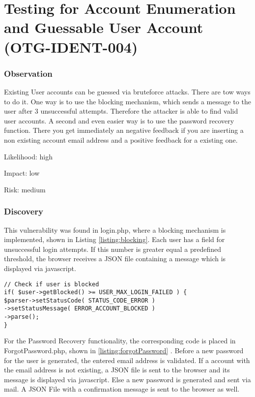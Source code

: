 \chapter{Testing for Account Enumeration and Guessable User Account (OTG-IDENT-004)}
\subsection{Observation}
Existing User accounts can be guessed via bruteforce attacks. There are tow ways to do it. One way is to use the blocking mechanism, which sends a message to the user after 3 unsuccessful attempts. Therefore the attacker is able to find valid user accounts.
A second and even easier way is to use the  password recovery function. There you get immediately an negative feedback if you are inserting a non existing account email address and a positive feedback for a existing  one.


Likelihood: high \newline

Impact: low\newline

Risk: medium\newline

\subsection{Discovery}
This vulnerability was found in login.php, where a blocking mechanism is implemented, shown in Listing \ref{listing:blocking}.  Each user has a field for unsuccessful login attempts. If this number is greater equal a predefined threshold, the browser  receives a JSON file containing a message which is displayed via javascript.
\begin{lstlisting}[caption= Blocking Mechanism in login.php line 54-59 ,label=listing:blocking]
// Check if user is blocked
if( $user->getBlocked() >= USER_MAX_LOGIN_FAILED ) {
$parser->setStatusCode( STATUS_CODE_ERROR )
->setStatusMessage( ERROR_ACCOUNT_BLOCKED )
->parse();
}
\end{lstlisting}

For the Password Recovery  functionality, the corresponding code is placed in ForgotPassword.php, shown in \ref{listing:forgotPassword} . Before a new password for the user is generated, the entered email address is validated.  If a account with the email address is not existing, a JSON file is sent to the browser and its message is displayed via javascript. Else a new password is generated and sent via mail. A JSON File with a confirmation message is sent to the browser as well. 

